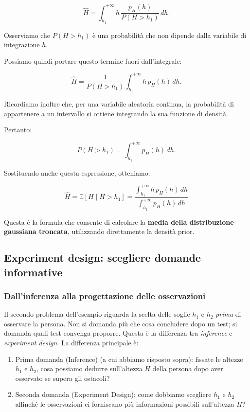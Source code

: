 \begin{equation*}
    \hat{H}
    =
    \int_{h_1}^{+\infty}
    h\,
    \frac{p_H(h)}{P(H>h_1)}
    \,dh.
\end{equation*}

Osserviamo che $P(H>h_1)$ è una probabilità che non dipende dalla variabile di integrazione $h$.

Possiamo quindi portare questo termine fuori dall'integrale:

\begin{equation*}
    \hat{H}
    =
    \frac{1}{P(H>h_1)}
    \int_{h_1}^{+\infty}
    h\,p_H(h)\,dh.
\end{equation*}

Ricordiamo inoltre che, per una variabile aleatoria continua, la probabilità di appartenere a un intervallo si ottiene integrando la sua funzione di densità.

Pertanto:

\begin{equation*}
    P(H>h_1)
    =
    \int_{h_1}^{+\infty}
    p_H(h)\,dh.
\end{equation*}

Sostituendo anche questa espressione, otteniamo:

\begin{equation*}
    \boxed{
    \hat{H}
    =
    \mathbb{E}[H\mid H>h_1]
    =
    \frac{
        \displaystyle\int_{h_1}^{+\infty}
        h\,p_H(h)\,dh
    }{
        \displaystyle\int_{h_1}^{+\infty}
        p_H(h)\,dh
    }
    }
\end{equation*}

Questa è la formula che consente di calcolare la \textbf{media della distribuzione gaussiana troncata}, utilizzando direttamente la densità prior.

\subsection{Experiment design: scegliere domande informative}

\subsubsection{Dall'inferenza alla progettazione delle osservazioni}
Il secondo problema dell'esempio riguarda la scelta delle soglie $h_1$ e $h_2$ \emph{prima} di osservare la persona. Non si domanda più che cosa concludere dopo un test; si domanda quali test convenga proporre. Questa è la differenza tra \emph{inference} e \emph{experiment design}.
La differenza principale è:
\begin{enumerate}
    \item Prima domanda (Inference) (a cui abbiamo risposto sopra): fissate le altezze \(h_1\) e \(h_2\), cosa possiamo dedurre sull'altezza \(H\) della persona dopo aver osservato se supera gli ostacoli?
    \item Seconda domanda (Experiment Design): come dobbiamo scegliere \(h_1\) e \(h_2\) affinché le osservazioni ci forniscano più informazioni possibili sull'altezza \(H\)?
\end{enumerate}

